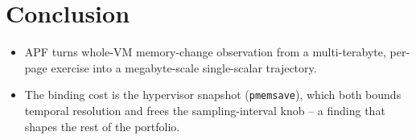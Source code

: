 \documentclass[conference]{IEEEtran}
\begin{document}
\section{Conclusion}
\begin{itemize}
  \item APF turns whole-VM memory-change observation from a multi-terabyte,
        per-page exercise into a megabyte-scale single-scalar trajectory.
  \item The binding cost is the hypervisor snapshot (\texttt{pmemsave}), which
        both bounds temporal resolution and frees the sampling-interval knob --
        a finding that shapes the rest of the portfolio.
\end{itemize}



\end{document}
